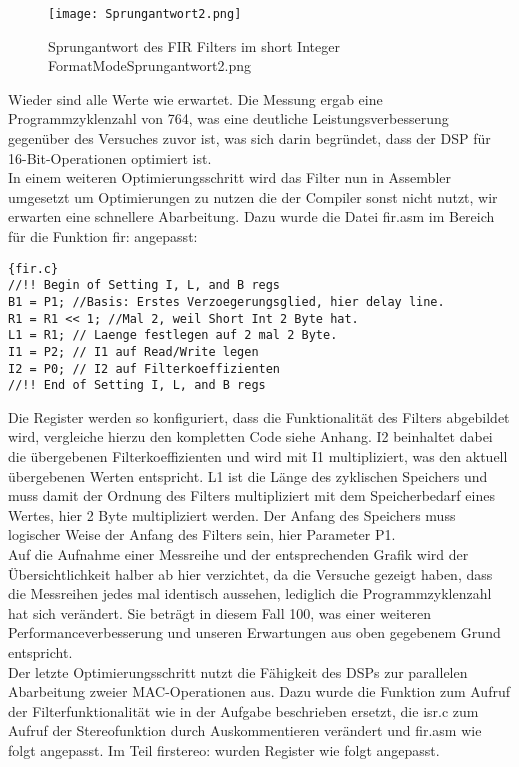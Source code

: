 \begin{figure}[H]
  \centering
    \texttt{[image: Sprungantwort2.png]}
  \caption{Sprungantwort des FIR Filters im short Integer Format\textunderscore Mode\textunderscore Sprungantwort2.png}
  \label{fig:SprAW2.png}%
\end{figure}
Wieder sind alle Werte wie erwartet.
Die Messung ergab eine Programmzyklenzahl von 764, was eine deutliche Leistungsverbesserung gegen\"uber des Versuches zuvor ist, was sich darin begr\"undet, dass der DSP f\"ur 16-Bit-Operationen optimiert ist.\\
In einem weiteren Optimierungsschritt wird das Filter nun in Assembler umgesetzt um Optimierungen zu nutzen die der Compiler sonst nicht nutzt, wir erwarten eine schnellere Abarbeitung.
Dazu wurde die Datei fir.asm im Bereich f\"ur die Funktion \textunderscore fir: angepasst:
\begin{adjustbox}{width=\textwidth,height=\textheight,keepaspectratio}
 \begin{lstlisting}[title=fir.c]{fir.c}
//!! Begin of Setting I, L, and B regs	
B1 = P1; //Basis: Erstes Verzoegerungsglied, hier delay line.
R1 = R1 << 1; //Mal 2, weil Short Int 2 Byte hat.
L1 = R1; // Laenge festlegen auf 2 mal 2 Byte.
I1 = P2; // I1 auf Read/Write legen
I2 = P0; // I2 auf Filterkoeffizienten
//!! End of Setting I, L, and B regs

\end{lstlisting}
\end{adjustbox}
Die Register werden so konfiguriert, dass die Funktionalität des Filters abgebildet wird, vergleiche hierzu den kompletten Code siehe Anhang. I2 beinhaltet dabei die \"ubergebenen Filterkoeffizienten und wird mit I1 multipliziert, was den aktuell \"ubergebenen Werten entspricht. L1 ist die L\"ange des zyklischen Speichers und muss damit der Ordnung des Filters multipliziert mit dem Speicherbedarf eines Wertes, hier 2 Byte multipliziert werden. Der Anfang des Speichers muss logischer Weise der Anfang des Filters sein, hier Parameter P1.\\

Auf die Aufnahme einer Messreihe und der entsprechenden Grafik wird der Übersichtlichkeit halber ab hier verzichtet, da die Versuche gezeigt haben, dass die Messreihen jedes mal identisch aussehen, lediglich die Programmzyklenzahl hat sich verändert. Sie beträgt in diesem Fall 100, was einer weiteren Performanceverbesserung und unseren Erwartungen aus oben gegebenem Grund entspricht.\\
Der letzte Optimierungsschritt nutzt die Fähigkeit des DSPs zur parallelen Abarbeitung zweier MAC-Operationen aus. Dazu wurde die Funktion zum Aufruf der Filterfunktionalität wie in der Aufgabe beschrieben ersetzt, die isr.c zum Aufruf der Stereofunktion durch Auskommentieren verändert und fir.asm wie folgt angepasst. Im Teil \textunderscore fir\textunderscore stereo: wurden Register wie folgt angepasst.

